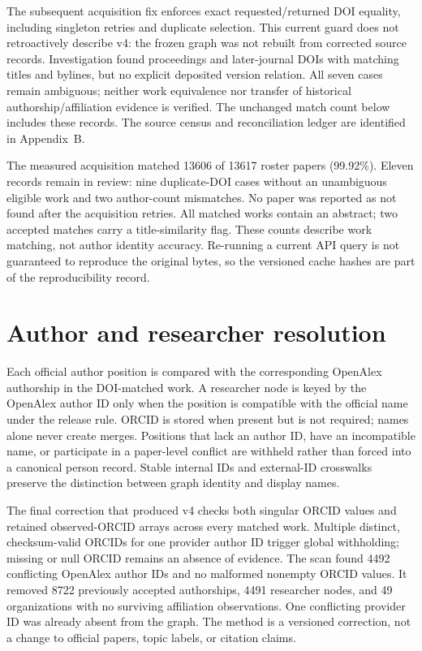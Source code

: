 The subsequent acquisition fix enforces exact requested/returned DOI equality,
including singleton retries and duplicate selection. This current guard does
not retroactively describe v4: the frozen graph was not rebuilt from corrected
source records. Investigation found proceedings and later-journal DOIs with
matching titles and bylines, but no explicit deposited version relation.
All seven cases remain ambiguous; neither work equivalence nor transfer of
historical authorship/affiliation evidence is verified. The unchanged match
count below includes these records. The source census and reconciliation ledger
are identified in Appendix~B.

The measured acquisition matched \num{13606} of \num{13617} roster papers
(99.92\%). Eleven records remain in review: nine duplicate-DOI cases without an
unambiguous eligible work and two author-count mismatches. No paper was reported
as not found after the acquisition retries. All matched works contain an abstract;
two accepted matches carry a title-similarity flag. These counts describe work
matching, not author identity accuracy. Re-running a current API query is not
guaranteed to reproduce the original bytes, so the versioned cache hashes are
part of the reproducibility record.

\section{Author and researcher resolution}

Each official author position is compared with the corresponding OpenAlex
authorship in the DOI-matched work. A researcher node is keyed by the OpenAlex
author ID only when the position is compatible with the official name under the
release rule. ORCID is stored when present but is not required; names alone never
create merges. Positions that lack an author ID, have an incompatible name, or
participate in a paper-level conflict are withheld rather than forced into a
canonical person record. Stable internal IDs and external-ID crosswalks preserve
the distinction between graph identity and display names.

The final correction that produced v4 checks both singular ORCID values and
retained observed-ORCID arrays across every matched work. Multiple distinct,
checksum-valid ORCIDs for one provider author ID trigger global withholding;
missing or null ORCID remains an absence of evidence. The scan found \num{4492}
conflicting OpenAlex author IDs and no malformed nonempty ORCID values. It removed
\num{8722} previously accepted authorships, \num{4491} researcher nodes, and 49
organizations with no surviving affiliation observations. One conflicting
provider ID was already absent from the graph. The method is a versioned
correction, not a change to official papers, topic labels, or citation claims.

